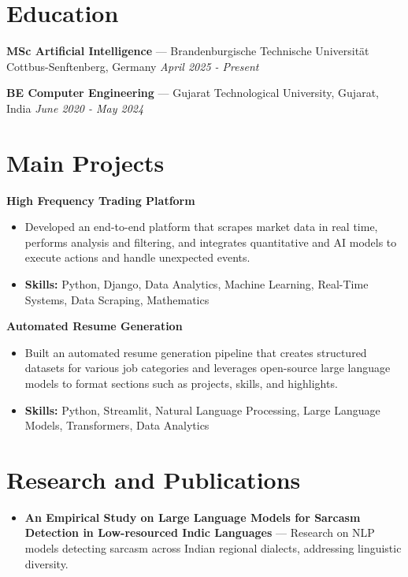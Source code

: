 \documentclass[a4paper,10pt]{article}
\begin{document}
\section*{Education}
\textbf{MSc Artificial Intelligence} — Brandenburgische Technische Universität Cottbus-Senftenberg, Germany \hfill \textit{April 2025 - Present}\par
\vspace{1.5pt}
\textbf{BE Computer Engineering} — Gujarat Technological University, Gujarat, India \hfill \textit{June 2020 - May 2024}\par

\section*{Main Projects}
\textbf{High Frequency Trading Platform}\par
\vspace{1pt}
\begin{itemize}
  \item Developed an end-to-end platform that scrapes market data in real time, performs analysis and filtering, and integrates quantitative and AI models to execute actions and handle unexpected events.
  \item \textbf{Skills:} Python, Django, Data Analytics, Machine Learning, Real-Time Systems, Data Scraping, Mathematics
\end{itemize}
\vspace{3pt}
\textbf{Automated Resume Generation}\par
\vspace{1pt}
\begin{itemize}
  \item Built an automated resume generation pipeline that creates structured datasets for various job categories and leverages open-source large language models to format sections such as projects, skills, and highlights.
  \item \textbf{Skills:} Python, Streamlit, Natural Language Processing, Large Language Models, Transformers, Data Analytics
\end{itemize}

\section*{Research and Publications}
\begin{itemize}
\item \textbf{An Empirical Study on Large Language Models for Sarcasm Detection in Low-resourced Indic Languages} — Research on NLP models detecting sarcasm across Indian regional dialects, addressing linguistic diversity.
\end{itemize}
\end{document}
